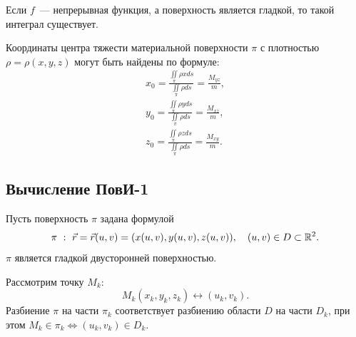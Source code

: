 \documentclass[../../main.tex]{subfiles}
\begin{document}
	Если $f$~--- непрерывная функция, а поверхность является гладкой, то такой 
	интеграл существует.

	Координаты центра тяжести материальной поверхности $\pi$ с плотностью $\rho =
	 \rho(x,y,z)$ могут быть найдены по формуле: 
	\begin{gather*}x_0 = \frac{\iint \limits_\pi \rho  x ds}{\iint \limits_\pi 
	\rho ds} =
	 \frac{M_{yz}}{m}, \\
	y_0 = \frac{\iint \limits_\pi \rho  y ds}{\iint \limits_\pi \rho ds} =
	 \frac{M_{xz}}{m}, \\
	z_0 = \frac{\iint \limits_\pi \rho  z ds}{\iint \limits_\pi \rho ds} =
	 \frac{M_{xy}}{m}.
	 \end{gather*}
	
	\subsection{Вычисление ПовИ-1}
	Пусть поверхность $\pi$ задана формулой \[\pi \ : \ \vec{r} =
	 \vec{r}(u, v) = (x(u,v), y(u,v), z(u, v)),\quad (u, v) \in D
	  \subset \mathbb{R}^2.\] $\pi$ является гладкой двусторонней
	   поверхностью.
	   
	Рассмотрим точку $M_k$:
	\[M_k(x_k, y_k, z_k) \leftrightarrow (u_k, v_k).\]
	Разбиение $\pi$ на части $\pi_k$ соответствует разбиению области $D$ на части 
	$D_k$, при 
	этом
	${M_k \in \pi_k} \iff (u_k, v_k) \in D_k$.
	 
\end{document}
